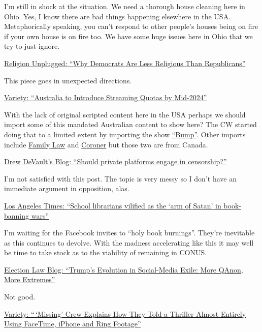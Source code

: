 I'm still in shock at the situation. We need a thorough house cleaning
here in Ohio. Yes, I know there are bad things happening elsewhere in
the USA. Metaphorically speaking, you can't respond to other people's
houses being on fire if your own house is on fire too. We have some huge
issues here in Ohio that we try to just ignore.

\href{https://religionunplugged.com/news/2023/1/23/analysis-data-shows-democrats-increasingly-becoming-the-party-of-non-religious-voters}{Religion
Unplugged: ``Why Democrats Are Less Religious Than Republicans''}

This piece goes in unexpected directions.

\href{https://variety.com/2023/biz/news/australia-streaming-quotas-1235506165/}{Variety:
``Australia to Introduce Streaming Quotas by Mid-2024''}

With the lack of original scripted content here in the USA perhaps we
should import some of this mandated Australian content to show here? The
CW started doing that to a limited extent by importing the show
\href{https://www.imdb.com/title/tt13751472/}{``Bump''}. Other imports
include
\href{https://www.imdb.com/title/tt11873484/?ref_=nv_sr_srsg_0}{Family
Law} and
\href{https://www.imdb.com/title/tt8593252/?ref_=nv_sr_srsg_0}{Coroner}
but those two are from Canada.

\href{https://drewdevault.com/2023/01/30/2023-01-30-Should-private-platforms-engage-in-censorship.html}{Drew
DeVault's Blog: ``Should private platforms engage in censorship?''}

I'm not satisfied with this post. The topic is very messy so I don't
have an immediate argument in opposition, alas.

\href{https://www.latimes.com/politics/story/2023-01-27/school-librarians-vilified-as-the-arm-of-satan-in-book-banning-wars}{Los
Angeles Times: ``School librarians vilified as the `arm of Satan' in
book-banning wars''}

I'm waiting for the Facebook invites to ``holy book burnings''. They're
inevitable as this continues to devolve. With the madness accelerating
like this it may well be time to take stock as to the viability of
remaining in CONUS.

\href{https://electionlawblog.org/?p=134506}{Election Law Blog:
``Trump's Evolution in Social-Media Exile: More QAnon, More Extremes''}

Not good.

\href{https://variety.com/2023/artisans/news/missing-crew-iphone-facetime-footage-easter-eggs-1235492655/}{Variety:
``\,`Missing' Crew Explains How They Told a Thriller Almost Entirely
Using FaceTime, iPhone and Ring Footage''}

